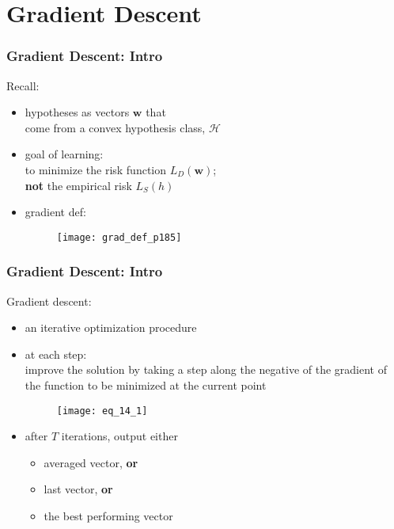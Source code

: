 \section{Gradient Descent}

\begin{frame}
\frametitle{Gradient Descent: Intro}

Recall:\\
\begin{itemize}
    \item hypotheses as vectors $\mathbf{w}$ that \\
         come from a convex hypothesis class, $\mathcal{H}$
    \item goal of learning:\\
          to minimize the risk function $L_D(\mathbf{w})$;\\
          \textbf{not} the empirical risk $L_S (h)$
    \item gradient def:
        \begin{figure}
            \centering
            \texttt{[image: grad\_def\_p185]}
        \end{figure}
\end{itemize}

\end{frame}

\begin{frame}
\frametitle{Gradient Descent: Intro}
Gradient descent:
\begin{itemize}
\item an iterative optimization procedure
\item at each step: \\
    improve the solution by
    taking a step along the negative of the gradient of the function to be minimized at the current point

    \begin{figure}
    \centering
    \texttt{[image: eq\_14\_1]}
    \end{figure}
\item after $T$ iterations, output either
    \begin{itemize}
        \item averaged vector, \textbf{or}
        \item last vector, \textbf{or}
        \item the best performing vector
    \end{itemize}
\end{itemize}

\end{frame}

